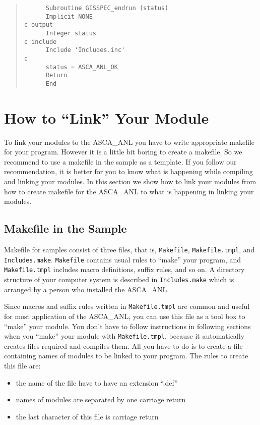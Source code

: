 \begin{quote}\baselineskip 3.2mm\begin{verbatim}
      Subroutine GISSPEC_endrun (status)
      Implicit NONE
c output
      Integer status
c include
      Include 'Includes.inc'
c
      status = ASCA_ANL_OK
      Return
      End
\end{verbatim}\end{quote}

\section{How to ``Link'' Your Module}
To link your modules to the ASCA\_ANL
you have to write appropriate makefile for your program.
However it is a little bit boring to create a makefile.
So we recommend to use a makefile in the sample as a template.
If you follow our recommendation,
it is better for you to know what is happening
while compiling and linking your modules.
In this section
we show how to link your modules
from how to create makefile for the ASCA\_ANL
to what is happening in linking your modules.

\subsection{Makefile in the Sample}
Makefile for samples consist of three files,
that is,
{\tt Makefile}, {\tt Makefile.tmpl}, and {\tt Includes.make}.
{\tt Makefile} contains usual rules to ``make'' your program,
and {\tt Makefile.tmpl} includes macro definitions, suffix rules, and so on.
A directory structure of your computer system
is described in {\tt Includes.make}
which is arranged by a person who installed the ASCA\_ANL.

Since macros and suffix rules written in {\tt Makefile.tmpl}
are common and useful for most application of the ASCA\_ANL,
you can use this file as a tool box to ``make'' your module.
You don't have to follow instructions in following sections
when you ``make'' your module with {\tt Makefile.tmpl},
because it automatically creates files required and compiles them.
All you have to do is to create a file
containing names of modules to be linked to your program.
The rules to create this file are:
\begin{itemize}
  \item the name of the file have to have an extension ``.def''
  \item names of modules are separated by one carriage return
  \item the last character of this file is carriage return
\end{itemize}

